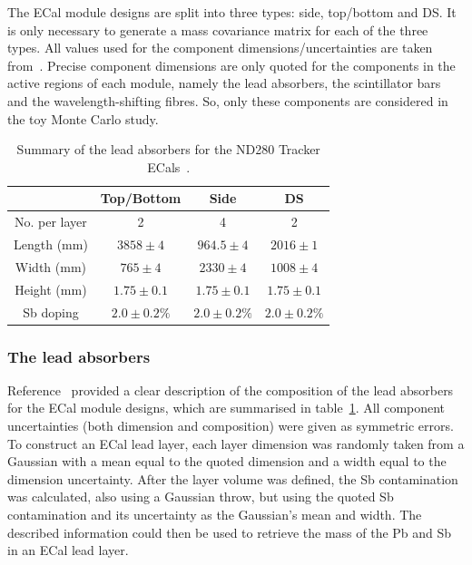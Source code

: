 \newline
\newline
The ECal module designs are split into three types: side, top/bottom and DS.  It is only necessary to generate a mass covariance matrix for each of the three types.  All values used for the component dimensions/uncertainties are taken from~\cite{1748-0221-8-10-P10019}.  Precise component dimensions are only quoted for the components in the active regions of each module, namely the lead absorbers, the scintillator bars and the wavelength-shifting fibres.  So, only these components are considered in the toy Monte Carlo study.  
\begin{table}[t!]
  \begin{tabular}{ c c c c }
     & Top/Bottom & Side & DS \\ \hline \hline
  No. per layer & 2 & 4 & 2 \\
  Length (mm) & $3858\pm4$ & $964.5\pm4$ & $2016\pm1$ \\
  Width (mm) & $765\pm4$ & $2330\pm4$ & $1008\pm4$ \\
  Height (mm) & $1.75\pm0.1$ & $1.75\pm0.1$ & $1.75\pm0.1$ \\
  Sb doping & $2.0\pm0.2\%$ & $2.0\pm0.2\%$ & $2.0\pm0.2\%$ \\
  \end{tabular}
  \caption{Summary of the lead absorbers for the ND280 Tracker ECals~\cite{1748-0221-8-10-P10019}.}
  \label{table:LeadAbsorberDimensions}
\end{table}


\subsubsection{The lead absorbers}
\label{subsubsec:ECalMassLeadAbsorbers}
Reference~\cite{1748-0221-8-10-P10019} provided a clear description of the composition of the lead absorbers for the ECal module designs, which are summarised in table~\ref{table:LeadAbsorberDimensions}.  All component uncertainties (both dimension and composition) were given as symmetric errors.  To construct an ECal lead layer, each layer dimension was randomly taken from a Gaussian with a mean equal to the quoted dimension and a width equal to the dimension uncertainty.  After the layer volume was defined, the Sb contamination was calculated, also using a Gaussian throw, but using the quoted Sb contamination and its uncertainty as the Gaussian's mean and width.  The described information could then be used to retrieve the mass of the Pb and Sb in an ECal lead layer.

